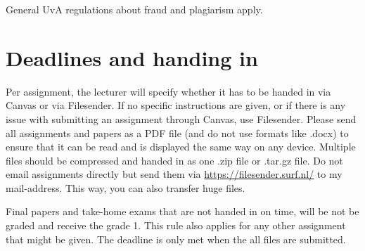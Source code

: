 \documentclass[a4paper,10pt,twocolumn]{report}
\begin{document}
General UvA regulations about fraud and plagiarism apply.

\section{Deadlines and handing in}
Per assignment, the lecturer will specify whether it has to be handed in via Canvas or via Filesender. If no specific instructions are given, or if there is any issue with submitting an assignment through Canvas, use Filesender. Please send all assignments and papers as a PDF file (and do not use formats like .docx) to ensure that it can be read and is displayed the same way on any device. Multiple files should be compressed and handed in as one .zip file or .tar.gz file. Do not email assignments directly but send them via \url{https://filesender.surf.nl/} to my mail-address. This way, you can also transfer huge files.

Final papers and take-home exams that are not handed in on time, will be not be graded and receive the grade 1. This rule also applies for any other assignment that might be given. The deadline is only met when the all files are submitted.
\end{document}
